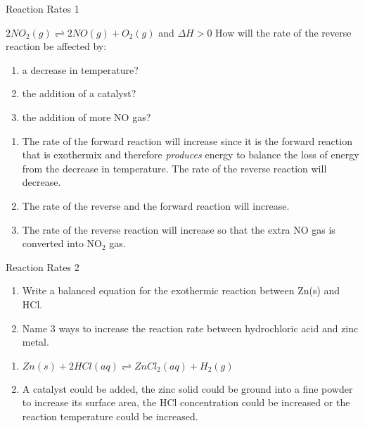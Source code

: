 \begin{wex}{Reaction Rates 1}{
$2NO_{2}(g)\rightleftharpoons 2NO(g) + O_{2}(g)$ and  $\Delta H > 0$
How will the rate of the reverse reaction be affected by:
\begin{enumerate}
  \item a decrease in temperature?
  \item the addition of a catalyst?
  \item the addition of more NO gas?
\end{enumerate}}
  {
\begin{enumerate}
  \item         The rate of the forward reaction will increase since it is the forward reaction that is exothermix and therefore \textit{produces} energy to balance the loss of energy from the decrease in temperature. The rate of the reverse reaction will decrease. 
 
  \item The rate of the reverse and the forward reaction will increase.
  \item         The rate of the reverse reaction
  will increase so that the extra NO gas is converted into NO$_{2}$ gas. 
\end{enumerate}}  
\end{wex}

\begin{wex}{Reaction Rates 2}{
\begin{enumerate}
  \item Write a balanced equation for the exothermic reaction between
  Zn(s) and HCl. 
  \item Name 3 ways to increase the reaction rate between hydrochloric
  acid and zinc metal.     
\end{enumerate}}  
   {
   \begin{enumerate}
     \item $Zn(s) + 2HCl(aq) \rightleftharpoons  ZnCl_{2}(aq)+ H_{2}(g)$
     \item A catalyst could be added, the zinc solid could be ground
     into a fine powder to increase its surface area, the HCl
     concentration could be increased or the reaction temperature
     could be increased.        
   \end{enumerate}}  
\end{wex}  

